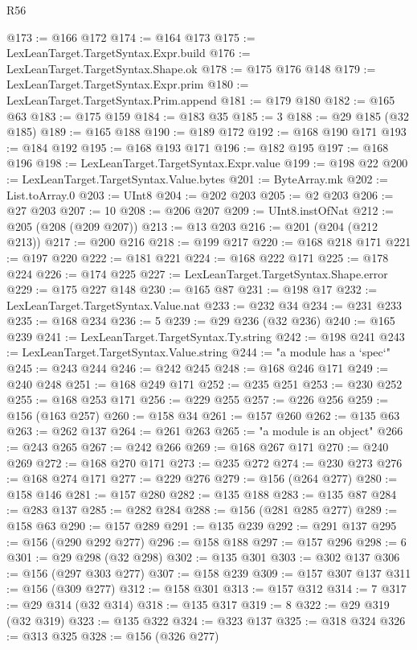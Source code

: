 \begin{lexlean}{R56}
\begin{coremodule}
{{{{{{{{{{{{{{{{{{{{{{{{{{{{{{{{{{{{{{{{{{{{{{{{{{{{{{{{{{{{{{{{{{{{{{{{{{{{{{{{{{{{{{{{{{{{{{{{{{{{{{{{{{{{{{{{{{{{{{{{{{{{{{{{{{{{{{{{{{{{{{{{{{{{{{{{{{{{{{{{{{{{{{{{{{{{{{{{{{{{{{{{{{{{{{{{{{{{{{{{{{{{{{{{{{{@173 := @166 @172
@174 := @164 @173
@175 := LexLeanTarget.TargetSyntax.Expr.build
@176 := LexLeanTarget.TargetSyntax.Shape.ok
@178 := @175 @176 @148
@179 := LexLeanTarget.TargetSyntax.Expr.prim
@180 := LexLeanTarget.TargetSyntax.Prim.append
@181 := @179 @180
@182 := @165 @63
@183 := @175 @159
@184 := @183 @35
@185 := 3
@188 := @29 @185 (@32 @185)
@189 := @165 @188
@190 := @189 @172
@192 := @168 @190 @171
@193 := @184 @192
@195 := @168 @193 @171
@196 := @182 @195
@197 := @168 @196
@198 := LexLeanTarget.TargetSyntax.Expr.value
@199 := @198 @22
@200 := LexLeanTarget.TargetSyntax.Value.bytes
@201 := ByteArray.mk
@202 := List.toArray.{0}
@203 := UInt8
@204 := @202 @203
@205 := @2 @203
@206 := @27 @203
@207 := 10
@208 := @206 @207
@209 := UInt8.instOfNat
@212 := @205 (@208 (@209 @207))
@213 := @13 @203
@216 := @201 (@204 (@212 @213))
@217 := @200 @216
@218 := @199 @217
@220 := @168 @218 @171
@221 := @197 @220
@222 := @181 @221
@224 := @168 @222 @171
@225 := @178 @224
@226 := @174 @225
@227 := LexLeanTarget.TargetSyntax.Shape.error
@229 := @175 @227 @148
@230 := @165 @87
@231 := @198 @17
@232 := LexLeanTarget.TargetSyntax.Value.nat
@233 := @232 @34
@234 := @231 @233
@235 := @168 @234
@236 := 5
@239 := @29 @236 (@32 @236)
@240 := @165 @239
@241 := LexLeanTarget.TargetSyntax.Ty.string
@242 := @198 @241
@243 := LexLeanTarget.TargetSyntax.Value.string
@244 := "a module has a `spec`"
@245 := @243 @244
@246 := @242 @245
@248 := @168 @246 @171
@249 := @240 @248
@251 := @168 @249 @171
@252 := @235 @251
@253 := @230 @252
@255 := @168 @253 @171
@256 := @229 @255
@257 := @226 @256
@259 := @156 (@163 @257)
@260 := @158 @34
@261 := @157 @260
@262 := @135 @63
@263 := @262 @137
@264 := @261 @263
@265 := "a module is an object"
@266 := @243 @265
@267 := @242 @266
@269 := @168 @267 @171
@270 := @240 @269
@272 := @168 @270 @171
@273 := @235 @272
@274 := @230 @273
@276 := @168 @274 @171
@277 := @229 @276
@279 := @156 (@264 @277)
@280 := @158 @146
@281 := @157 @280
@282 := @135 @188
@283 := @135 @87
@284 := @283 @137
@285 := @282 @284
@288 := @156 (@281 @285 @277)
@289 := @158 @63
@290 := @157 @289
@291 := @135 @239
@292 := @291 @137
@295 := @156 (@290 @292 @277)
@296 := @158 @188
@297 := @157 @296
@298 := 6
@301 := @29 @298 (@32 @298)
@302 := @135 @301
@303 := @302 @137
@306 := @156 (@297 @303 @277)
@307 := @158 @239
@309 := @157 @307 @137
@311 := @156 (@309 @277)
@312 := @158 @301
@313 := @157 @312
@314 := 7
@317 := @29 @314 (@32 @314)
@318 := @135 @317
@319 := 8
@322 := @29 @319 (@32 @319)
@323 := @135 @322
@324 := @323 @137
@325 := @318 @324
@326 := @313 @325
@328 := @156 (@326 @277)
}}}}}}}}}}}}}}}}}}}}}}}}}}}}}}}}}}}}}}}}}}}}}}}}}}}}}}}}}}}}}}}}}}}}}}}}}}}}}}}}}}}}}}}}}}}}}}}}}}}}}}}}}}}}}}}}}}}}}}}}}}}}}}}}}}}}}}}}}}}}}}}}}}}}}}}}}}}}}}}}}}}}}}}}}}}}}}}}}}}}}}}}}}}}}}}}}}}}}}}}}}}}}}}}}}}
\end{coremodule}
\end{lexlean}
